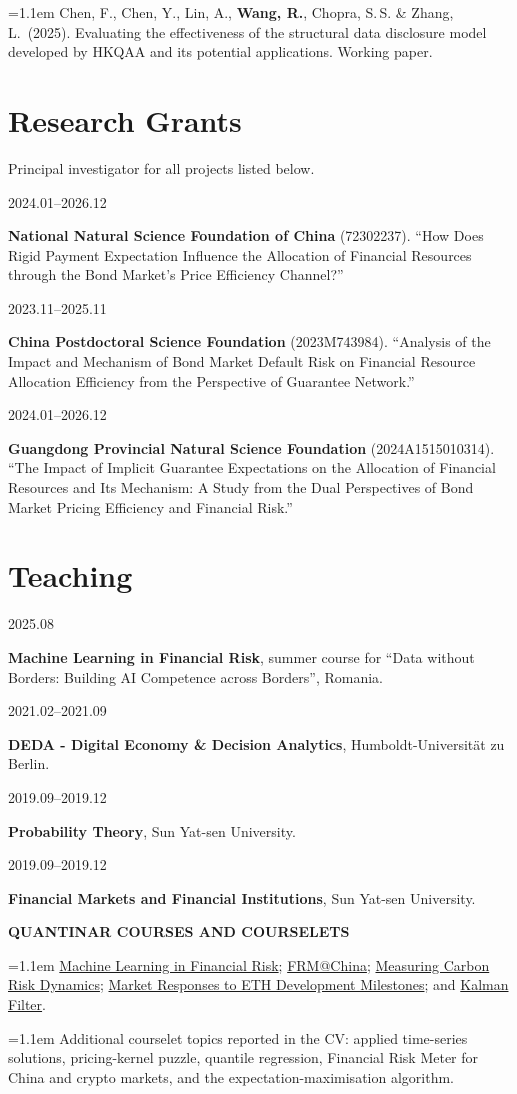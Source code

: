 \documentclass[11pt]{article}
\newcommand{\RW}{\textbf{Wang, R.}}
\newcommand{\corr}{\raisebox{0.55ex}{\sff\fontsize{6.5}{6.5}\selectfont*}}
\newcommand{\subhead}[1]{%
  \par\addvspace{8pt}\needspace{3\baselineskip}%
  {\sff\bfseries\fontsize{9}{11}\selectfont\color{plumdeep}%
    \addfontfeature{LetterSpace=3.0}\MakeUppercase{#1}}%
  \par\vspace{3pt}}
\newcommand{\pubitem}[1]{%
  \par\begingroup\sloppy\noindent\fontsize{9.2}{12.3}\selectfont%
  \hangindent=1.1em\hangafter=1 #1\par\endgroup\addvspace{3.4pt}}
\newcommand{\cvrow}[2]{%
  \par\noindent\needspace{2\baselineskip}%
  \begin{minipage}[t]{0.17\linewidth}\raggedright\sff\footnotesize\color{plum}#1\end{minipage}%
  \hfill\begin{minipage}[t]{0.81\linewidth}#2\end{minipage}%
  \par\addvspace{5.5pt}}
\begin{document}
\pubitem{Chen, F., Chen, Y., Lin, A., \RW, Chopra, S.\,S. \& Zhang, L.\corr\ (2025).
Evaluating the effectiveness of the structural data disclosure model developed by HKQAA
and its potential applications. Working paper.}

\section{Research Grants}
{\footnotesize\color{muted}Principal investigator for all projects listed below.}
\par\vspace{4pt}
\cvrow{2024.01--2026.12}{\textbf{National Natural Science Foundation of China} (72302237).
``How Does Rigid Payment Expectation Influence the Allocation of Financial Resources through
the Bond Market's Price Efficiency Channel?''}
\cvrow{2023.11--2025.11}{\textbf{China Postdoctoral Science Foundation} (2023M743984).
``Analysis of the Impact and Mechanism of Bond Market Default Risk on Financial Resource
Allocation Efficiency from the Perspective of Guarantee Network.''}
\cvrow{2024.01--2026.12}{\textbf{Guangdong Provincial Natural Science Foundation}
(2024A1515010314). ``The Impact of Implicit Guarantee Expectations on the Allocation of
Financial Resources and Its Mechanism: A Study from the Dual Perspectives of Bond Market
Pricing Efficiency and Financial Risk.''}

\section{Teaching}
\cvrow{2025.08}{\textbf{Machine Learning in Financial Risk}, summer course for
``Data without Borders: Building AI Competence across Borders'', Romania.}
\cvrow{2021.02--2021.09}{\textbf{DEDA - Digital Economy \& Decision Analytics},
Humboldt-Universit\"at zu Berlin.}
\cvrow{2019.09--2019.12}{\textbf{Probability Theory}, Sun Yat-sen University.}
\cvrow{2019.09--2019.12}{\textbf{Financial Markets and Financial Institutions},
Sun Yat-sen University.}

\subhead{Quantinar courses and courselets}
\pubitem{\href{https://quantinar.com/course/934/machine-learning-in-financial-risk}{Machine Learning in Financial Risk};
\href{https://www.quantinar.com/course/43/FRM}{FRM@China};
\href{https://quantinar.com/course/923/measuring-carbon-risk-dynamics?q=cardi}{Measuring Carbon Risk Dynamics};
\href{https://quantinar.com/course/857/market-responses-to-eth-development-milestones}{Market Responses to ETH Development Milestones};
and \href{https://www.quantinar.com/course/42/methodology}{Kalman Filter}.}
\pubitem{Additional courselet topics reported in the CV: applied time-series solutions,
pricing-kernel puzzle, quantile regression, Financial Risk Meter for China and crypto markets,
and the expectation-maximisation algorithm.}
\end{document}
